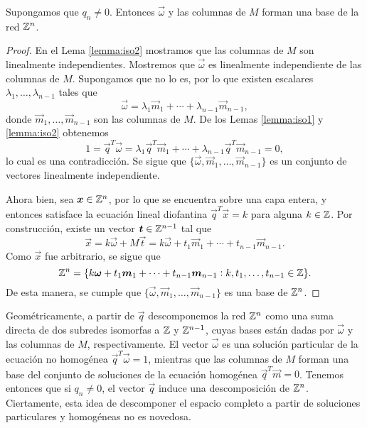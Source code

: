 \begin{theorem}
	\label{th:lattice}
	Supongamos que $q_n \neq 0$. Entonces $\vec{\omega}$ y las columnas de $M$ forman una base
	de la red $\mathbb{Z}^n$.
\end{theorem}
\begin{proof}
	En el Lema \ref{lemma:iso2} mostramos que las columnas de $M$ son linealmente independientes.
	Mostremos que $\vec{\omega}$ es linealmente independiente de las columnas de $M$. Supongamos que
	no lo es, por lo que existen escalares $\lambda_1, \ldots, \lambda_{n-1}$ tales que
	\begin{equation*}
		\vec{\omega} = \lambda_1 \vec{m}_1 + \cdots + \lambda_{n-1} \vec{m}_{n-1},
	\end{equation*}
	donde $\vec{m}_1, \ldots, \vec{m}_{n-1}$ son las columnas de $M$. De los Lemas \ref{lemma:iso1}
	y \ref{lemma:iso2} obtenemos
	\begin{equation*}
		1 = \vec{q}^T\vec{\omega} = \lambda_1 \vec{q}^T\vec{m}_1 + \cdots + \lambda_{n-1}
		\vec{q}^T\vec{m}_{n-1} = 0,
	\end{equation*}
	lo cual es una contradicción. Se sigue que $\lbrace \vec{\omega}, \vec{m}_1, \ldots,
	\vec{m}_{n-1}\rbrace$ es un conjunto de vectores linealmente independiente.

	Ahora bien, sea $\boldsymbol{x} \in \mathbb{Z}^n$, por lo que se encuentra sobre una capa entera, y entonces
	satisface la ecuación lineal diofantina $\vec{q}^T\vec{x} = k$ para alguna $k \in \mathbb{Z}$. Por
	construcción, existe un vector $\boldsymbol{t} \in \mathbb{Z}^{n-1}$ tal que
	\begin{equation*}
		\vec{x} = k\vec{\omega} + M\vec{t} = k\vec{\omega} + t_1\vec{m}_1 + \cdots +
		t_{n-1}\vec{m}_{n-1}.
	\end{equation*}
	Como $\vec{x}$ fue arbitrario, se sigue que
	\begin{equation*}
		\mathbb{Z}^n = \lbrace
		k\boldsymbol{\omega} + t_1\boldsymbol{m}_1 + \cdots + t_{n-1}\boldsymbol{m}_{n-1}
		\vcentcolon k, t_1, \ldots, t_{n-1} \in \mathbb{Z}
		\rbrace.
	\end{equation*}
	De esta manera, se cumple que $\lbrace \vec{\omega}, \vec{m}_1, \ldots, \vec{m}_{n-1}\rbrace$ es
	una base de $\mathbb{Z}^n$.
\end{proof}

Geométricamente, a partir de $\vec{q}$ descomponemos la red $\mathbb{Z}^n$ como una suma directa de dos
subredes isomorfas a $\mathbb{Z}$ y $\mathbb{Z}^{n-1}$, cuyas bases están dadas por $\vec{\omega}$ y las columnas de
$M$, respectivamente. El vector $\vec{\omega}$ es una solución particular de la ecuación no
homogénea $\vec{q}^T\vec{\omega} = 1$, mientras que las columnas de $M$ forman una base del conjunto
de soluciones de la ecuación homogénea $\vec{q}^T\vec{m} = 0$. Tenemos entonces que si $q_n
\neq 0$, el vector $\vec{q}$ induce una descomposición de $\mathbb{Z}^n$. Ciertamente, esta idea de
descomponer el espacio completo a partir de soluciones particulares y homogéneas no es novedosa.

